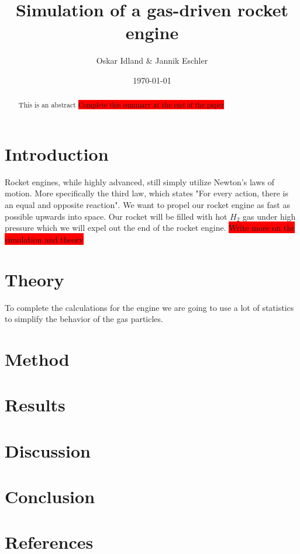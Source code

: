 \documentclass[reprint,english,notitlepage]{revtex4-2}
\begin{document}
\title{Simulation of a gas-driven rocket engine}
\author{Oskar Idland \& Jannik Eschler}
\date{\today}

\begin{abstract}
This is an abstract \colorbox{red}{Complete this summary at the end of the paper}
\end{abstract}
\maketitle

\section{Introduction}
	Rocket engines, while highly advanced, still simply utilize Newton's laws of motion. More specifically the third law, which states "For every action, there is an equal and opposite reaction". We want to propel our rocket engine as fast as possible upwards into space.
	Our rocket will be filled with hot $ H_2 $ gas under high pressure which we will expel out the end of the rocket engine. \colorbox{red}{Write more on the simulation and theory}
\section{Theory}
To complete the calculations for the engine we are going to use a lot of statistics to simplify the behavior of the gas particles. 
\section{Method}
\section{Results}
\section{Discussion}
\section{Conclusion}
\section{References}
\end{document}
